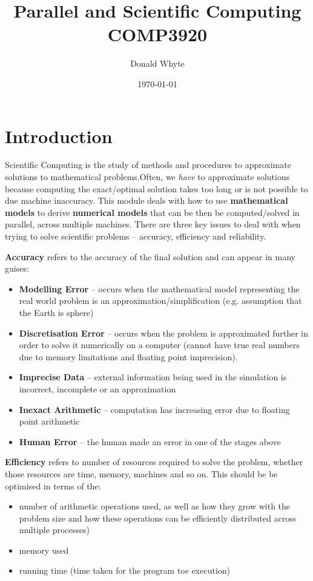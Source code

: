 \documentclass{article}
\title{Parallel and Scientific Computing \\ COMP3920}
\author{Donald Whyte}
\date{\today}
\begin{document}
\maketitle

\pagebreak
\tableofcontents

\pagebreak
\listoffigures

\pagebreak
\listoftables

\pagebreak

\section{Introduction}

Scientific Computing is the study of methods and procedures to approximate solutions to mathematical problems.Often, we \textit{have} to approximate solutions because computing the exact/optimal solution takes too long or is not possible to due machine inaccuracy. This module deals with how to use \textbf{mathematical models} to derive \textbf{numerical models} that can be then be computed/solved in parallel, across multiple machines. There are three key issues to deal with when trying to solve scientific problems -- accuracy, efficiency and reliability.

\textbf{Accuracy} refers to the accuracy of the final solution and can appear in many guises:
\begin{itemize}
	\item \textbf{Modelling Error} -- occurs when the mathematical model representing the real world problem is an approximation/simplification (e.g. assumption that the Earth is  sphere)
	\item \textbf{Discretisation Error} -- occurs when the problem is approximated further in order to solve it numerically on a computer (cannot have true real numbers  due to memory limitations and floating point imprecision).
	\item \textbf{Imprecise Data} -- external information being used in the simulation is incorrect, incomplete or an approximation
	\item \textbf{Inexact Arithmetic} -- computation has increasing error due to floating point arithmetic
	\item \textbf{Human Error} -- the human made an error in one of the stages above
\end{itemize}

\textbf{Efficiency} refers to number of resources required to solve the problem, whether those resources are time, memory, machines and so on. This should be be optimised in terms of the:
\begin{itemize}
	\item number of arithmetic operations used, as well as how they grow with the problem size and how these operations can be efficiently distributed across multiple processes)
	\item memory used
	\item running time (time taken for the program toe execution)
\end{itemize}
\end{document}
